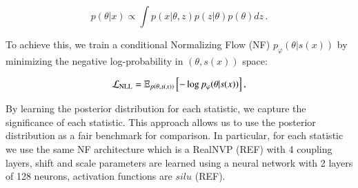 \documentclass{aa}
\begin{document}
\begin{equation}
    p(\theta | x) \propto \int p(x | \theta, z) p(z|\theta) p(\theta) dz\,.
\end{equation}

To achieve this, we train a  conditional Normalizing Flow (NF) $p_{\varphi} (\theta | s(x)) $ by minimizing the negative log-probability in $(\theta, s(x))$ space:

\begin{equation}
    \mathcal{L}_{\rm NLL} = \mathbb{E}_{p(\theta, s(x))} \left[ - \log p_{\varphi} (\theta | s(x))  \right],
    \label{eq:nll}
\end{equation}

By learning the posterior distribution for each statistic, we capture the significance of each statistic. This approach allows us to use the posterior distribution as a fair benchmark for comparison.
In particular, for each statistic we use the same NF architecture which is a RealNVP (REF) with 4 coupling layers, shift and scale parameters are learned using a neural network with 2 layers of 128 neurons, activation functions are $silu$ (REF).

\end{document}

